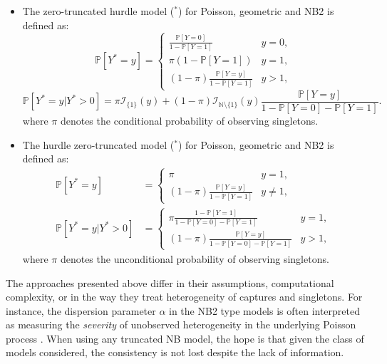 \documentclass[
]{jss}
\newcommand{\1}{\mathcal{I}} \newcommand{\bZero}{\boldsymbol{0}}
\begin{document}
\begin{itemize}
    \item The zero-truncated hurdle model ($^\ast$) for Poisson, geometric and NB2 is defined as:
    \begin{equation*}
        \mathbb{P}\left[Y^{\ast}=y\right]=\begin{cases}
        \frac{\mathbb{P}[Y=0]}{1-\mathbb{P}[Y=1]} & y=0, \\
        \pi(1-\mathbb{P}[Y=1]) & y=1, \\
        (1-\pi) \frac{\mathbb{P}[Y=y]}{1-\mathbb{P}[Y=1]} & y>1,
        \end{cases}
    \end{equation*}
    \begin{equation*}
        \mathbb{P}\left[Y^{\ast}=y|Y^{\ast}>0\right]=\pi\mathcal{I}_{\{1\}}(y)+
        (1-\pi)\mathcal{I}_{\mathbb{N}\setminus\{1\}}(y)\frac{\mathbb{P}[Y=y]}{1-\mathbb{P}[Y=0]-\mathbb{P}[Y=1]}.
    \end{equation*}
    where $\pi$ denotes the conditional probability of observing singletons.
    \item The hurdle zero-truncated model ($^\ast$) for Poisson, geometric and NB2 is defined as:
    \begin{align*}
        \mathbb{P}\left[Y^{\ast}=y\right]&=\begin{cases}
        \pi & y=1, \\
        (1-\pi) \frac{\mathbb{P}[Y=y]}{1-\mathbb{P}[Y=1]} & y\neq1,
        \end{cases}\\
        \mathbb{P}\left[Y^{\ast}=y|Y^{\ast}>0\right]&=\begin{cases}
            \pi\frac{1-\mathbb{P}[Y=1]}{1-\mathbb{P}[Y=0]-\mathbb{P}[Y=1]} & y=1,\\
            (1-\pi)\frac{\mathbb{P}[Y=y]}{1-\mathbb{P}[Y=0]-\mathbb{P}[Y=1]} & y>1,
        \end{cases}
    \end{align*}
    where $\pi$ denotes the unconditional probability of observing singletons.
\end{itemize}

The approaches presented above differ in their assumptions,
computational complexity, or in the way they treat heterogeneity of
captures and singletons. For instance, the dispersion parameter
\(\alpha\) in the NB2 type models is often interpreted as measuring the
\textit{severity} of unobserved heterogeneity in the underlying Poisson
process \citep[cf.][]{ztnegbin}. When using any truncated NB model, the
hope is that given the class of models considered, the consistency is
not lost despite the lack of information.
\end{document}

